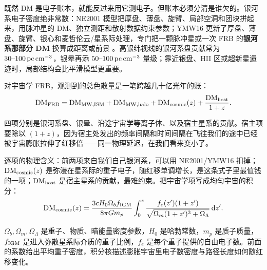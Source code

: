 既然 DM 是电子账本，就能反过来用它测电子。但账本必须分清是谁欠的。银河系电子密度绝非常数：NE2001 模型把厚盘、薄盘、旋臂、局部空洞和团块拼起来，用脉冲星的 DM、独立测距和散射数据约束参数；YMW16 更新了厚盘、薄盘、旋臂、银心和麦哲伦云/星系际处理，专门把一颗脉冲星或一次 FRB 的\textbf{银河系那部分 DM} 换算成距离或前景 \citep{2002astro.ph..7156C,2017ApJ...835...29Y}。高银纬视线的银河系盘贡献常为 \(30\text{--}100\,{\rm pc\,cm^{-3}}\)，银晕再添 \(50\text{--}100\,{\rm pc\,cm^{-3}}\) 量级；靠近银盘、HII 区或超新星遗迹时，局部结构会比平滑模型更重要。

对宇宙学 FRB，观测到的总色散量是一笔跨越几十亿光年的账：
\begin{equation}
  {\rm DM}_{\rm FRB}
  =
  {\rm DM}_{\rm MW,ISM}
  +{\rm DM}_{\rm MW,halo}
  +{\rm DM}_{\rm cosmic}(z)
  +\frac{{\rm DM}_{\rm host}}{1+z} .
  \label{eq:e21-frb-dm-budget}
\end{equation}
\begin{formulaexplain}
四项分别是银河系盘、银晕、沿途宇宙学等离子体、以及宿主星系的贡献。宿主项要除以 \((1+z)\)，因为宿主处发出的频率间隔和时间间隔在飞往我们的途中已经被宇宙膨胀拉伸了红移倍——同一物理延迟，在我们看来变小了。
\end{formulaexplain}
逐项的物理含义：前两项来自我们自己银河系，可以用 NE2001/YMW16 扣掉；\({\rm DM}_{\rm cosmic}(z)\) 是弥漫在星系际的重子电子，随红移单调增长，是这条式子里最值钱的一项；\({\rm DM}_{\rm host}\) 是宿主星系的贡献，最难约束。把宇宙学项写成均匀宇宙的积分：
\begin{equation}
  {\rm DM}_{\rm cosmic}(z)
  =
  \frac{3cH_0\Omega_b f_{\rm IGM}}{8\pi Gm_p}
  \int_0^z
  \frac{f_e(z')(1+z')}{\sqrt{\Omega_m(1+z')^3+\Omega_\Lambda}}
  \,{\rm d}z' .
  \label{eq:e21-cosmic-dm}
\end{equation}
\begin{formulaexplain}
\(\Omega_b,\Omega_m,\Omega_\Lambda\) 是重子、物质、暗能量密度参数，\(H_0\) 是哈勃常数，\(m_p\) 是质子质量，\(f_{\rm IGM}\) 是进入弥散星系际介质的重子比例，\(f_e\) 是每个重子提供的自由电子数。前面的系数给出平均重子密度，积分核描述膨胀宇宙里电子数密度与路径长度如何随红移变化。
\end{formulaexplain}

